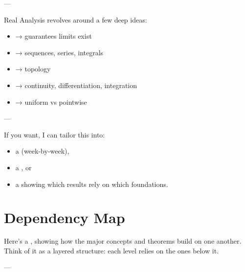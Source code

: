 \documentclass[12pt,a4paper]{report}
\begin{document}
\begin{description}
---

\item {}

Real Analysis revolves around a few deep ideas:

		\begin{itemize}
        \item {} → guarantees limits exist
        \item {} → sequences, series, integrals
        \item {} → topology
        \item {} → continuity, differentiation, integration
        \item {} → uniform vs pointwise
		\end{itemize}

---
\end{description}

If you want, I can tailor this into:

		\begin{itemize}
        \item a  (week-by-week),
        \item a , or
        \item a  showing which results rely on which foundations.
		\end{itemize}

\newpage
\section*{Dependency Map}

Here’s a , showing how the major concepts and theorems build on one another. Think of it as a layered structure: each level relies on the ones below it.

---
\end{document}
